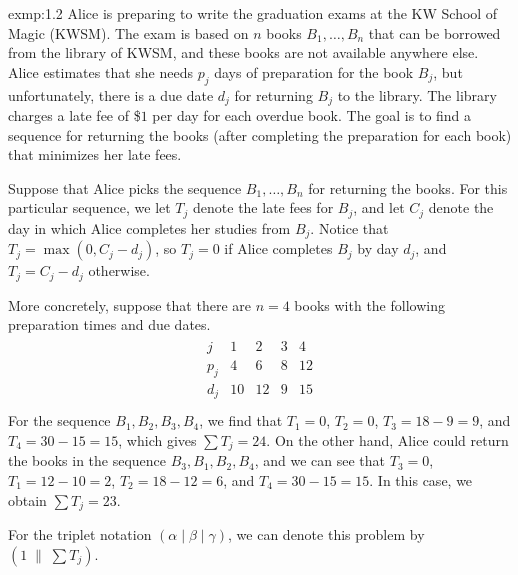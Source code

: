 \begin{exmp}{exmp:1.2}
    Alice is preparing to write the graduation exams at the KW School of 
    Magic (KWSM). The exam is based on $n$ books $B_1, \dots, B_n$ that 
    can be borrowed from the library of KWSM, and these books are not 
    available anywhere else. Alice estimates that she needs $p_j$ days of 
    preparation for the book $B_j$, but unfortunately, there is a due 
    date $d_j$ for returning $B_j$ to the library. The library charges 
    a late fee of \$$1$ per day for each overdue book. The goal is to 
    find a sequence for returning the books (after completing the 
    preparation for each book) that minimizes her late fees. 

    Suppose that Alice picks the sequence $B_1, \dots, B_n$ for 
    returning the books. For this particular sequence, we let 
    $T_j$ denote the late fees for $B_j$, and let $C_j$ denote the day 
    in which Alice completes her studies from $B_j$. Notice that 
    $T_j = \max(0, C_j - d_j)$, so $T_j = 0$ if Alice completes $B_j$ 
    by day $d_j$, and $T_j = C_j - d_j$ otherwise. 

    More concretely, suppose that there are $n = 4$ books with the 
    following preparation times and due dates. 
    \begin{align*}
        \begin{array}{c|cccc}
            j   & 1  & 2  & 3 & 4  \\ \hline
            p_j & 4  & 6  & 8 & 12 \\
            d_j & 10 & 12 & 9 & 15 \\
        \end{array}
    \end{align*}
    For the sequence $B_1, B_2, B_3, B_4$, we find that $T_1 = 0$, 
    $T_2 = 0$, $T_3 = 18 - 9 = 9$, and $T_4 = 30 - 15 = 15$, which gives 
    $\sum T_j = 24$. On the other hand, Alice could return the books 
    in the sequence $B_3, B_1, B_2, B_4$, and we can see that 
    $T_3 = 0$, $T_1 = 12 - 10 = 2$, $T_2 = 18 - 12 = 6$, and $T_4
    = 30 - 15 = 15$. In this case, we obtain $\sum T_j = 23$. 

    For the triplet notation $(\alpha \mid \beta \mid \gamma)$, we can 
    denote this problem by $(1\;\|\;\sum T_j)$. 
\end{exmp}

